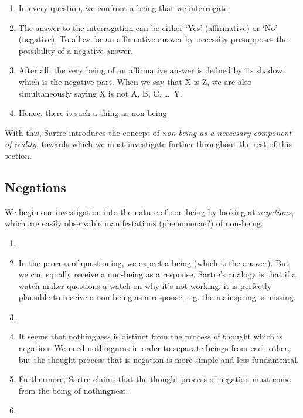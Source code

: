 \begin{enumerate}
  \item In every question, we confront a being that we interrogate.
  \item The answer to the interrogation can be either `Yes' (affirmative) or `No' (negative). To allow for an affirmative answer by necessity presupposes the possibility of a negative answer.
  \item After all, the very being of an affirmative answer is defined by its shadow, which is the negative part. When we say that X is Z, we are also simultaneously saying X is not A, B, C, \ldots\ Y.
  \item Hence, there is such a thing as non-being
\end{enumerate}

\noindent
With this, Sartre introduces the concept of \emph{non-being as a neccesary component of reality}, towards which we must investigate further throughout the rest of this section.

\subsection{Negations}
We begin our investigation into the nature of non-being by looking at \emph{negations}, which are easily observable manifestations (phenomenae?) of non-being.

\begin{enumerate}
  \item {}
  \item In the process of questioning, we expect a being (which is the answer). But we can equally receive a non-being as a response. Sartre's analogy is that if a watch-maker questions a watch on why it's not working, it is perfectly plausible to receive a non-being as a response, e.g. the mainspring is missing.
  \item {}
  \item It seems that nothingness is distinct from the process of thought which is negation. We need nothingness in order to separate beings from each other, but the thought process that is negation is more simple and less fundamental.
  \item Furthermore, Sartre claims that the thought process of negation must come from the being of nothingness.
  \item {}
\end{enumerate}

